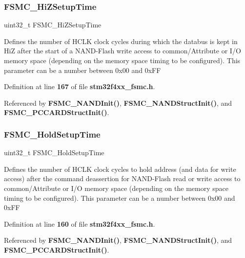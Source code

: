 \subsubsection{F\+S\+M\+C\+\_\+\+Hi\+Z\+Setup\+Time}
{\footnotesize\ttfamily uint32\+\_\+t F\+S\+M\+C\+\_\+\+Hi\+Z\+Setup\+Time}

Defines the number of H\+C\+LK clock cycles during which the databus is kept in HiZ after the start of a N\+A\+N\+D-\/\+Flash write access to common/\+Attribute or I/O memory space (depending on the memory space timing to be configured). This parameter can be a number between 0x00 and 0x\+FF 

Definition at line \textbf{ 167} of file \textbf{ stm32f4xx\+\_\+fsmc.\+h}.



Referenced by \textbf{ F\+S\+M\+C\+\_\+\+N\+A\+N\+D\+Init()}, \textbf{ F\+S\+M\+C\+\_\+\+N\+A\+N\+D\+Struct\+Init()}, and \textbf{ F\+S\+M\+C\+\_\+\+P\+C\+C\+A\+R\+D\+Struct\+Init()}.

\mbox{\label{structFSMC__NAND__PCCARDTimingInitTypeDef_a9830626a2ab6b45fa384adbc5c55eb69}} 
\subsubsection{F\+S\+M\+C\+\_\+\+Hold\+Setup\+Time}
{\footnotesize\ttfamily uint32\+\_\+t F\+S\+M\+C\+\_\+\+Hold\+Setup\+Time}

Defines the number of H\+C\+LK clock cycles to hold address (and data for write access) after the command deassertion for N\+A\+N\+D-\/\+Flash read or write access to common/\+Attribute or I/O memory space (depending on the memory space timing to be configured). This parameter can be a number between 0x00 and 0x\+FF 

Definition at line \textbf{ 160} of file \textbf{ stm32f4xx\+\_\+fsmc.\+h}.



Referenced by \textbf{ F\+S\+M\+C\+\_\+\+N\+A\+N\+D\+Init()}, \textbf{ F\+S\+M\+C\+\_\+\+N\+A\+N\+D\+Struct\+Init()}, and \textbf{ F\+S\+M\+C\+\_\+\+P\+C\+C\+A\+R\+D\+Struct\+Init()}.

